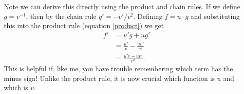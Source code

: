 Note we can derive this directly using the product and chain rules. If we define $g = v^{-1}$, then by the chain rule $g' = -v'/v^2$. Defining $f = u \cdot g$ and substituting this into the product rule (equation \eqref{product}) we get
\begin{align*}
    f' &= u'g + ug'\\
       &= \frac{u'}{v} -\frac{uv'}{v^2}  \\
       &= \frac{u'v - uv'}{v^2}.
\end{align*}
This is helpful if, like me, you have trouble remembering which term has the minus sign! Unlike the product rule, it is now crucial which function is $u$ and which is $v$.

\begin{example}
    
\end{example}
